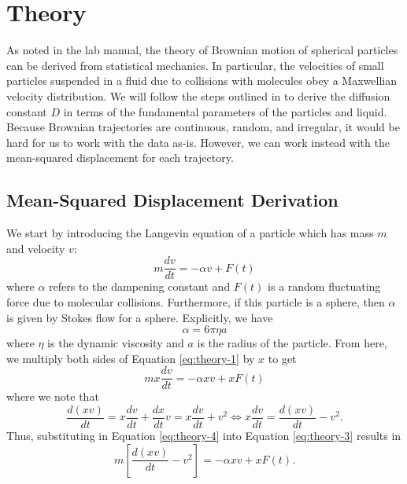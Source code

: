 \documentclass[twocolumn,amsmath,amssymb,pra, floatfix]{revtex4-2}
\begin{document}
\section{Theory}
As noted in the lab manual, the theory of Brownian motion of spherical particles can be derived from statistical mechanics. In particular, the velocities of small particles suspended in a fluid due to collisions with molecules obey a Maxwellian velocity distribution. We will follow the steps outlined in \cite{doi:10.1119/1.2386163} to derive the diffusion constant $D$ in terms of the fundamental parameters of the particles and liquid. Because Brownian trajectories are continuous, random, and irregular, it would be hard for us to work with the data as-is. However, we can work instead with the mean-squared displacement for each trajectory. 

\subsection{Mean-Squared Displacement Derivation}
We start by introducing the Langevin equation of a particle which has mass $m$ and velocity $v$:
\begin{equation}
    m \frac{ d v }{ d t }
    =
    - \alpha v + F( t ) 
    \label{eq:theory-1}
\end{equation}
where $\alpha$ refers to the dampening constant and $F( t )$ is a random fluctuating force due to molecular collisions. Furthermore, if this particle is a sphere, then $\alpha$ is given by Stokes flow for a sphere. Explicitly, we have 
\begin{equation}
    \alpha 
    =
    6 \pi \eta a
    \label{eq:theory-2}
\end{equation}
where $\eta$ is the dynamic viscosity and $a$ is the radius of the particle. From here, we multiply both sides of Equation \ref{eq:theory-1} by $x$ to get 
\begin{equation}
    m x \frac{ d v }{ d t }
    =
    - \alpha x v + x F( t )
    \label{eq:theory-3}
\end{equation}
where we note that 
\begin{equation}
    \frac{ d ( x v ) }{ d t }
    =
    x \frac{ d v }{ d t } + \frac{ d x }{ d t } v
    =
    x \frac{ d v }{ d t } + v^{ 2 }
    \iff 
    x \frac{ d v }{ d t }
    =
    \frac{ d ( x v ) }{ d t } - v^{ 2 }.
    \label{eq:theory-4}
\end{equation}
Thus, substituting in Equation \ref{eq:theory-4} into Equation \ref{eq:theory-3} results in 
\begin{equation}
    m
    \left[
        \frac{ d ( x v ) }{ d t } - v^{ 2 }
    \right]
    =
    - \alpha x v + x F( t ).
    \label{eq:theory-5}
\end{equation}
\end{document}
